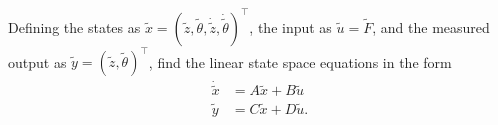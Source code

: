 Defining the states as $\tilde{x}=(\tilde{z},\tilde{\theta},\dot{\tilde{z}},\dot{\tilde{\theta}})^{\top}$, the input as $\tilde{u}=\tilde{F}$, and the measured output as $\tilde{y}=(\tilde{z},\tilde{\theta})^{\top}$, find the linear state space equations in the form
\begin{align*}
	\dot{\tilde{x}} &= A\tilde{x} + B\tilde{u} \\
	\tilde{y} &= C\tilde{x} + D\tilde{u}.
\end{align*} 

